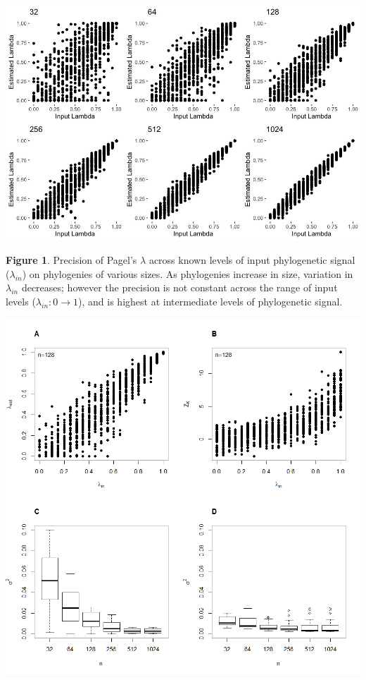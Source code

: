 \documentclass[
]{article}
\begin{document}
\newpage

\includegraphics[width=0.95\linewidth]{Fig1}

\singlespacing \textbf{Figure 1}. Precision of Pagel's \(\lambda\)
across known levels of input phylogenetic signal (\(\lambda_{in}\)) on
phylogenies of various sizes. As phylogenies increase in size, variation
in \(\lambda_{in}\) decreases; however the precision is not constant
across the range of input levels (\(\lambda_{in}: 0 \to 1\)), and is
highest at intermediate levels of phylogenetic signal.

\newpage

\includegraphics[width=0.95\linewidth]{Fig2}
\end{document}
